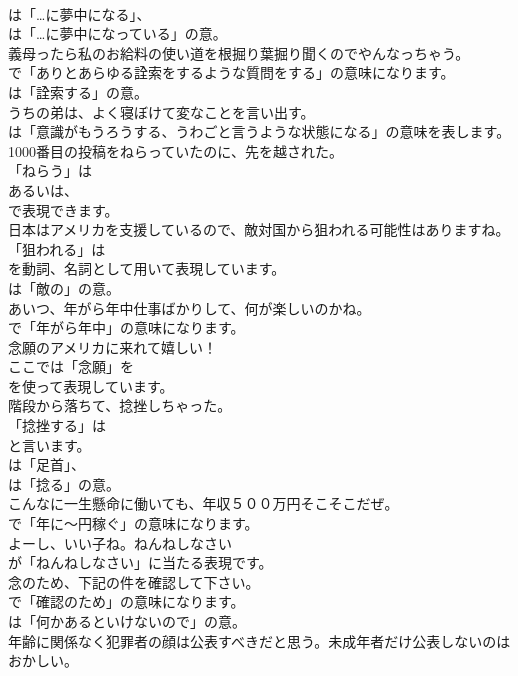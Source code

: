\documentclass[8pt]{extreport}
\begin{document}
\begin{CJK}{UTF8}{min}
\\	は「…に夢中になる」、
\\	は「…に夢中になっている」の意。	
\\	義母ったら私のお給料の使い道を根掘り葉掘り聞くのでやんなっちゃう。 
\\	で「ありとあらゆる詮索をするような質問をする」の意味になります。
\\	は「詮索する」の意。	
\\	うちの弟は、よく寝ぼけて変なことを言い出す。 
\\	は「意識がもうろうする、うわごと言うような状態になる」の意味を表します。	
\\	1000番目の投稿をねらっていたのに、先を越された。 
\\	「ねらう」は
\\	あるいは、
\\	で表現できます。	
\\	日本はアメリカを支援しているので、敵対国から狙われる可能性はありますね。 
\\	「狙われる」は 
\\	を動詞、名詞として用いて表現しています。
\\	は「敵の」の意。	
\\	あいつ、年がら年中仕事ばかりして、何が楽しいのかね。 
\\	で「年がら年中」の意味になります。	
\\	念願のアメリカに来れて嬉しい！ 
\\	ここでは「念願」を
\\	を使って表現しています。	
\\	階段から落ちて、捻挫しちゃった。 
\\	「捻挫する」は 
\\	と言います。
\\	は「足首」、
\\	は「捻る」の意。	
\\	こんなに一生懸命に働いても、年収５００万円そこそこだぜ。 
\\	で「年に～円稼ぐ」の意味になります。	
\\	よーし、いい子ね。ねんねしなさい 
\\	が「ねんねしなさい」に当たる表現です。	
\\	念のため、下記の件を確認して下さい。 
\\	で「確認のため」の意味になります。
\\	は「何かあるといけないので」の意。	
\\	年齢に関係なく犯罪者の顔は公表すべきだと思う。未成年者だけ公表しないのはおかしい。 

\end{CJK}
\end{document}
